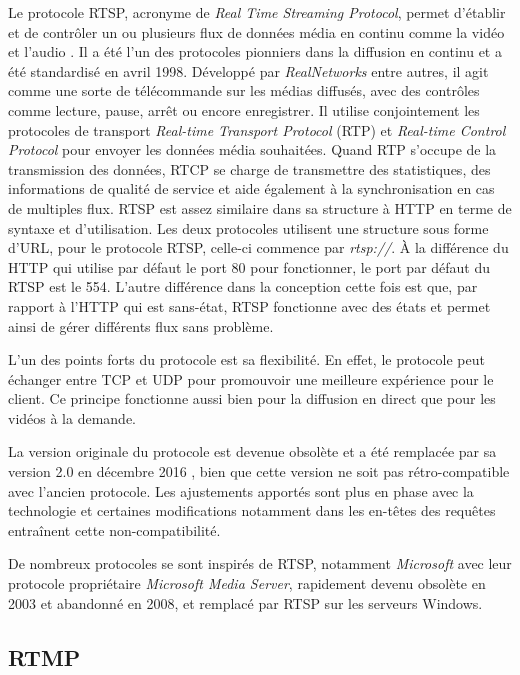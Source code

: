 \documentclass{polytech/polytech}
\begin{document}
Le protocole RTSP, acronyme de \textit{Real Time Streaming Protocol}, permet d’établir et de contrôler un ou plusieurs flux de données média en continu comme la vidéo et l’audio \cite{rtsp_1996}. Il a été l’un des protocoles pionniers dans la diffusion en continu et a été standardisé en avril 1998. Développé par \textit{RealNetworks} entre autres, il agit comme une sorte de télécommande sur les médias diffusés, avec des contrôles comme lecture, pause, arrêt ou encore enregistrer. Il utilise conjointement les protocoles de transport \textit{Real-time Transport Protocol} (RTP) et \textit{Real-time Control Protocol} pour envoyer les données média souhaitées. Quand RTP s’occupe de la transmission des données, RTCP se charge de transmettre des statistiques, des informations de qualité de service et aide également à la synchronisation en cas de multiples flux. RTSP est assez similaire dans sa structure à HTTP en terme de syntaxe et d’utilisation. Les deux protocoles utilisent une structure sous forme d’URL, pour le protocole RTSP, celle-ci commence par \textit{rtsp://}. À la différence du HTTP qui utilise par défaut le port 80 pour fonctionner, le port par défaut du RTSP est le 554. L’autre différence dans la conception cette fois est que, par rapport à l’HTTP qui est sans-état, RTSP fonctionne avec des états et permet ainsi de gérer différents flux sans problème.

L’un des points forts du protocole est sa flexibilité. En effet, le protocole peut échanger entre TCP et UDP pour promouvoir une meilleure expérience pour le client. Ce principe fonctionne aussi bien pour la diffusion en direct que pour les vidéos à la demande.

La version originale du protocole est devenue obsolète et a été remplacée par sa version 2.0 en décembre 2016 \cite{rao_real-time_2016}, bien que cette version ne soit pas rétro-compatible avec l’ancien protocole. Les ajustements apportés sont plus en phase avec la technologie et certaines modifications notamment dans les en-têtes des requêtes entraînent cette non-compatibilité.

De nombreux protocoles se sont inspirés de RTSP, notamment \textit{Microsoft} avec leur protocole propriétaire \textit{Microsoft Media Server}, rapidement devenu obsolète en 2003 et abandonné en 2008, et remplacé par RTSP sur les serveurs Windows.


\subsection{RTMP}
\end{document}
